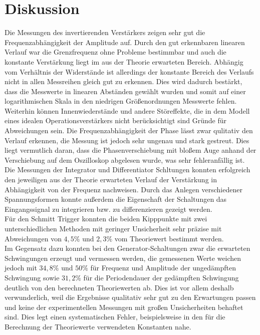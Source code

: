 \newpage
\section{Diskussion}
\label{sec:Diskussion}
Die Messungen des invertierenden Verstärkers zeigen sehr gut die Frequenzabhängigkeit der Amplitude auf. Durch den gut erkennbaren linearen Verlauf war die Grenzfrequenz ohne Probleme bestimmbar und auch die konstante Verstärkung liegt im aus der Theorie erwarteten Bereich. Abhängig vom Verhältnis der Widerstände ist allerdings der konstante Bereich des Verlaufs nicht in allen Messreihen gleich gut zu erkennen. Dies wird dadurch bestärkt, dass die Messwerte in linearen Abständen gewählt wurden und somit auf einer logarithmischen Skala in den niedrigen Größenordnungen Messwerte fehlen. Weiterhin können Innenwiederstände und andere Störeffekte, die in dem Modell eines idealen Operationsverstärkers nicht berücksichtigt sind Gründe für Abweichungen sein. Die Frequenzabhängigkeit der Phase lässt zwar qulitativ den Verlauf erkennen, die Messung ist jedoch sehr ungenau und stark gestreut. Dies liegt vermutlich daran, dass die Phasenverschiebung mit bloßem Auge anhand der Verschiebung auf dem Oszilloskop abgelesen wurde, was sehr fehleranfällig ist. \\
Die Messungen der Integrator und Differentiator Schltungen konnten erfolgreich den jeweiligen aus der Theorie erwarteten Verlauf der Verstärkung in Abhängigkeit von der Frequenz nachweisen. Durch das Anlegen verschiedener Spannungsformen konnte außerdem die Eigenschaft der Schaltungen das Eingangssignal zu integrieren bzw. zu differenzieren gezeigt werden.\\
Für den Schmitt Trigger konnten die beiden Kipppunkte mit zwei unterschiedlichen Methoden mit geringer Unsicherheit sehr präzise mit Abweichungen von  $4,5\%$ und $2,3\%$ vom Theoriewert bestimmt werden. \\
Im Gegensatz dazu konnten bei den Generator-Schaltungen zwar die erwarteten Schwingungen erzeugt und vermessen werden, die gemessenen Werte weichen jedoch mit $34,8\%$ und $50\%$ für Frequenz und Amplitude der ungedämpften Schwingung sowie $31,2\%$ für die Periodendauer der gedämpften Schwingung deutlich von den berechneten Theoriewerten ab. Dies ist vor allem deshalb verwunderlich, weil die Ergebnisse qualitativ sehr gut zu den Erwartungen passen und keine der experimentellen Messungen mit großen Unsicherheiten behaftet sind. Dies legt einen systematischen Fehler, beispielsweise in den für die Berechnung der Theoriewerte verwendeten Konstanten nahe. 
